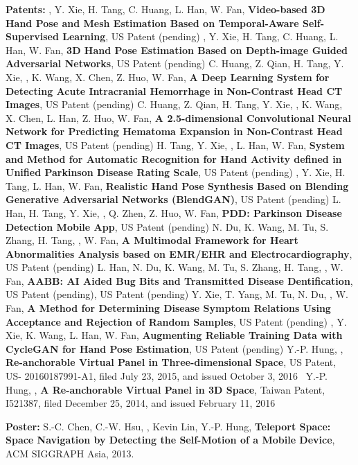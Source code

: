 \textbf{Patents:} \vspace{-3pt}
\PubItemStart
    \pubitem \mikelin, Y. Xie, H. Tang, C. Huang, L. Han, W. Fan, \textbf{Video-based 3D Hand Pose and Mesh Estimation Based on Temporal-Aware Self-Supervised Learning}, US Patent (pending)
    \pubitem \mikelin, Y. Xie, H. Tang, C. Huang, L. Han, W. Fan, \textbf{3D Hand Pose Estimation Based on Depth-image Guided Adversarial Networks}, US Patent (pending)
    \pubitem C. Huang, Z. Qian, H. Tang, Y. Xie, \mikelin, K. Wang, X. Chen, Z. Huo, W. Fan, \textbf{A Deep Learning System for Detecting Acute Intracranial Hemorrhage in Non-Contrast Head CT Images}, US Patent (pending)
    \pubitem C. Huang, Z. Qian, H. Tang, Y. Xie, \mikelin, K. Wang, X. Chen, L. Han, Z. Huo, W. Fan, \textbf{A 2.5-dimensional Convolutional Neural Network for Predicting Hematoma Expansion in Non-Contrast Head CT Images}, US Patent (pending)
    \pubitem H. Tang, Y. Xie, \mikelin, L. Han, W. Fan, \textbf{System and Method for Automatic Recognition for Hand Activity defined in Unified Parkinson Disease Rating Scale}, US Patent (pending)
    \pubitem \mikelin, Y. Xie, H. Tang, L. Han, W. Fan, \textbf{Realistic Hand Pose Synthesis Based on Blending Generative Adversarial Networks (BlendGAN)}, US Patent (pending)
    \pubitem L. Han, H. Tang, Y. Xie, \mikelin, Q. Zhen, Z. Huo, W. Fan, \textbf{PDD: Parkinson Disease Detection Mobile App},  US Patent (pending)
    \pubitem N. Du, K. Wang, M. Tu, S. Zhang, H. Tang, \mikelin, W. Fan, \textbf{A Multimodal Framework for Heart Abnormalities Analysis based on EMR/EHR and Electrocardiography}, US Patent (pending)
    \pubitem L. Han, N. Du, K. Wang, M. Tu, S. Zhang, H. Tang, \mikelin, W. Fan, \textbf{AABB: AI Aided Bug Bits and Transmitted Disease Dentification}, US Patent (pending), US Patent (pending)
    \pubitem Y. Xie, T. Yang, M. Tu, N. Du, \mikelin, W. Fan, \textbf{A Method for Determining Disease Symptom Relations Using Acceptance and Rejection of Random Samples}, US Patent (pending)
    \pubitem \mikelin, Y. Xie, K. Wang, L. Han, W. Fan, \textbf{Augmenting Reliable Training Data with CycleGAN for Hand Pose Estimation}, US Patent (pending)
    \pubitem Y.-P. Hung, \mikelin, \textbf{Re-anchorable Virtual Panel in Three-dimensional Space}, US Patent, US- 20160187991-A1, filed July 23, 2015, and issued October 3, 2016~\href{https://patents.google.com/patent/US9529446}{\faFileTextO}
    \pubitem Y.-P. Hung, \mikelin, \textbf{A Re-anchorable Virtual Panel in 3D Space}, Taiwan Patent, I521387, filed December 25, 2014, and issued February 11, 2016
\PubItemEnd

\textbf{Poster:} \vspace{-3pt}
\PubItemStart
    \pubitem S.-C. Chen, C.-W. Hsu, \mikelin, Kevin Lin, Y.-P. Hung, \textbf{Teleport Space: Space Navigation by Detecting the Self-Motion of a Mobile Device}, ACM SIGGRAPH Asia, 2013.
\PubItemEnd
